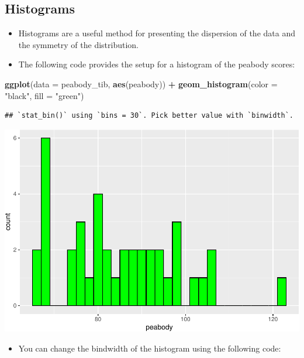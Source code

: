 \documentclass[
]{book}
\newenvironment{Shaded}{\begin{snugshade}}{\end{snugshade}}
\newcommand{\AttributeTok}[1]{\textcolor[rgb]{0.13,0.29,0.53}{#1}}
\newcommand{\FunctionTok}[1]{\textcolor[rgb]{0.13,0.29,0.53}{\textbf{#1}}}
\newcommand{\NormalTok}[1]{#1}
\newcommand{\SpecialCharTok}[1]{\textcolor[rgb]{0.81,0.36,0.00}{\textbf{#1}}}
\newcommand{\StringTok}[1]{\textcolor[rgb]{0.31,0.60,0.02}{#1}}
\providecommand{\tightlist}{%
  \setlength{\itemsep}{0pt}\setlength{\parskip}{0pt}}
\begin{document}
\subsection{Histograms}\label{histograms}

\begin{itemize}
\item
  Histograms are a useful method for presenting the dispersion of the data and the symmetry of the distribution.
\item
  The following code provides the setup for a histogram of the peabody scores:
\end{itemize}

\begin{Shaded}
\begin{Highlighting}[]
\FunctionTok{ggplot}\NormalTok{(}\AttributeTok{data =}\NormalTok{ peabody\_tib, }\FunctionTok{aes}\NormalTok{(peabody)) }\SpecialCharTok{+}
  \FunctionTok{geom\_histogram}\NormalTok{(}\AttributeTok{color =} \StringTok{"black"}\NormalTok{, }\AttributeTok{fill =} \StringTok{"green"}\NormalTok{)}
\end{Highlighting}
\end{Shaded}

\begin{verbatim}
## `stat_bin()` using `bins = 30`. Pick better value with `binwidth`.
\end{verbatim}

\includegraphics{PSY202A-Modeling-I.Heo_files/figure-latex/unnamed-chunk-76-1.pdf}

\begin{itemize}
\tightlist
\item
  You can change the bindwidth of the histogram using the following code:
\end{itemize}
\end{document}
